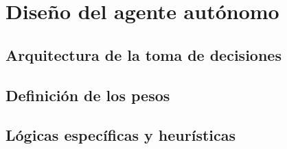 \chapter{Diseño del agente autónomo} \label{chap:software_bot}


\section{Arquitectura de la toma de decisiones} \label{sec:arquitectura_toma_decisiones}


\section{Definición de los pesos} \label{sec:definicion_pesos}


\section{Lógicas específicas y heurísticas} \label{sec:logicas_especificas}
